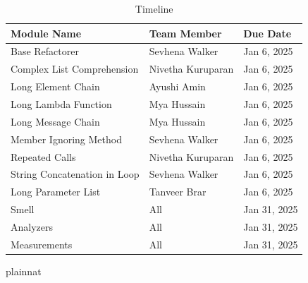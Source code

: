 \documentclass[12pt, titlepage]{article}
\begin{document}
\begin{table}[h!]
  \centering
  \caption{Timeline}
  \begin{tabular}{|l|l|l|}
  \hline
  \textbf{Module Name} & \textbf{Team Member}        & \textbf{Due Date} \\ \hline
  Base Refactorer                     & Sevhena Walker              & Jan 6, 2025    \\ \hline
  Complex List Comprehension          & Nivetha Kuruparan              & Jan 6, 2025    \\ \hline
  Long Element Chain                  & Ayushi Amin              & Jan 6, 2025     \\ \hline
  Long Lambda Function                & Mya Hussain              & Jan 6, 2025     \\ \hline
  Long Message Chain                  & Mya Hussain              & Jan 6, 2025     \\ \hline
  Member Ignoring Method              & Sevhena Walker             & Jan 6, 2025     \\ \hline
  Repeated Calls                      & Nivetha Kuruparan               & Jan 6, 2025     \\ \hline
  String Concatenation in Loop        & Sevhena Walker              & Jan 6, 2025     \\ \hline
  Long Parameter List                 & Tanveer Brar              & Jan 6, 2025     \\ \hline
  Smell                               & All             & Jan 31, 2025    \\ \hline
  Analyzers                           & All            & Jan 31, 2025      \\ \hline
  Measurements                        & All          & Jan 31, 2025      \\ \hline
  \end{tabular}
  \end{table}
  

 {plainnat}


\newpage{}
\end{document}
